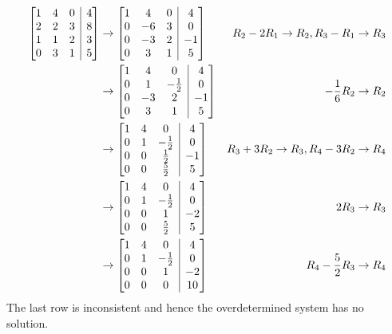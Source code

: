 \begin{solution}
\begin{align*}
\left[\begin{array}{@{}ccc|c@{}}
1 & 4 & 0 & 4\\
2 & 2 & 3 & 8\\
1 & 1 & 2 & 3\\
0 & 3 & 1 & 5\\
\end{array}\right] 
& \to 
\left[\begin{array}{@{}ccc|c@{}}
1 & 4 & 0 & 4\\
0 & -6 & 3 & 0\\
0 & -3 & 2 & -1\\
0 & 3 & 1 & 5\\
\end{array}\right] 
& R_2 - 2R_1 \to R_2, R_3 - R_1 \to R_3 \\ 
& \to
\left[\begin{array}{@{}ccc|c@{}}
1 & 4 & 0 & 4\\
0 & 1 & -\frac{1}{2} & 0\\
0 & -3 & 2 & -1\\
0 & 3 & 1 & 5\\
\end{array}\right] 
& -\frac{1}{6}R_2 \to R_2  \\    
& \to
\left[\begin{array}{@{}ccc|c@{}}
1 & 4 & 0 & 4\\
0 & 1 & -\frac{1}{2} & 0\\
0 & 0 & \frac{1}{2} & -1\\
0 & 0 & \frac{5}{2} & 5\\
\end{array}\right] 
& R_3 + 3R_2 \to R_3, R_4 - 3R_2 \to R_4  \\   
& \to
\left[\begin{array}{@{}ccc|c@{}}
1 & 4 & 0 & 4\\
0 & 1 & -\frac{1}{2} & 0\\
0 & 0 & 1 & -2\\
0 & 0 & \frac{5}{2} & 5\\
\end{array}\right] 
& 2R_3 \to R_3 \\ 
& \to
\left[\begin{array}{@{}ccc|c@{}}
1 & 4 & 0 & 4\\
0 & 1 & -\frac{1}{2} & 0\\
0 & 0 & 1 & -2\\
0 & 0 & 0 & 10\\
\end{array}\right] 
& R_4 - \frac{5}{2}R_3 \to R_4 \\ 
\end{align*}
The last row is inconsistent and hence the overdetermined system has no solution.
\end{solution}

